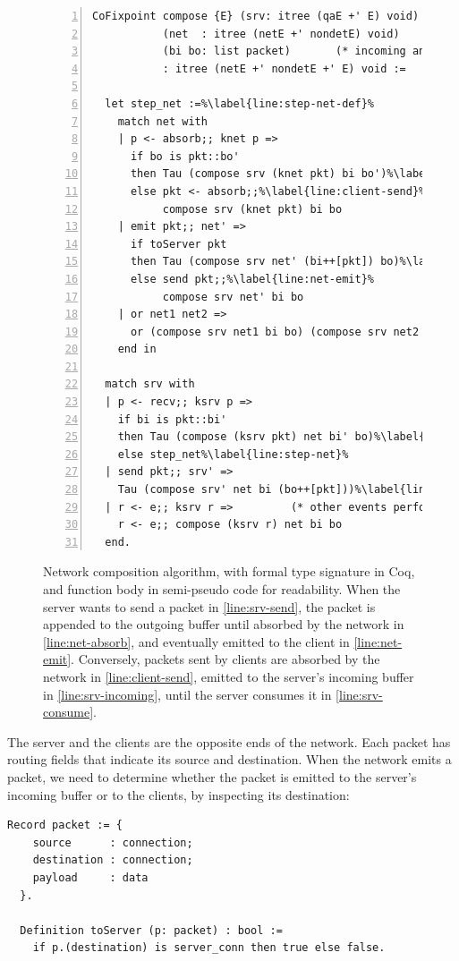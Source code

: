 \begin{figure}
\begin{lstlisting}[style=customcoq,numbers=left,escapechar=\%]
CoFixpoint compose {E} (srv: itree (qaE +' E) void)   (* server  model *)
           (net  : itree (netE +' nondetE) void)      (* network model *)
           (bi bo: list packet)       (* incoming and outgoing buffers *)
           : itree (netE +' nondetE +' E) void :=

  let step_net :=%\label{line:step-net-def}%
    match net with
    | p <- absorb;; knet p =>
      if bo is pkt::bo'
      then Tau (compose srv (knet pkt) bi bo')%\label{line:net-absorb}%
      else pkt <- absorb;;%\label{line:client-send}%
           compose srv (knet pkt) bi bo
    | emit pkt;; net' =>
      if toServer pkt
      then Tau (compose srv net' (bi++[pkt]) bo)%\label{line:srv-incoming}%
      else send pkt;;%\label{line:net-emit}%
           compose srv net' bi bo
    | or net1 net2 =>
      or (compose srv net1 bi bo) (compose srv net2 bi bo)
    end in

  match srv with
  | p <- recv;; ksrv p =>
    if bi is pkt::bi'
    then Tau (compose (ksrv pkt) net bi' bo)%\label{line:srv-consume}%
    else step_net%\label{line:step-net}%
  | send pkt;; srv' =>
    Tau (compose srv' net bi (bo++[pkt]))%\label{line:srv-send}%
  | r <- e;; ksrv r =>         (* other events performed by the server *)
    r <- e;; compose (ksrv r) net bi bo
  end.
\end{lstlisting}
\caption[Network composition algorithm]{Network composition algorithm, with
  formal type signature in Coq, and function body in semi-pseudo code for
  readability.  When the server wants to send a packet in
  \autoref{line:srv-send}, the packet is appended to the outgoing buffer until
  absorbed by the network in \autoref{line:net-absorb}, and eventually emitted
  to the client in \autoref{line:net-emit}.  Conversely, packets sent by clients
  are absorbed by the network in \autoref{line:client-send}, emitted to the
  server's incoming buffer in \autoref{line:srv-incoming}, until the server
  consumes it in \autoref{line:srv-consume}.}
\label{fig:net-compose-code}
\end{figure}

The server and the clients are the opposite ends of the network.  Each packet
has routing fields that indicate its source and destination.  When the network
emits a packet, we need to determine whether the packet is emitted to the
server's incoming buffer or to the clients, by inspecting its destination:
\begin{lstlisting}[style=customcoq]
  Record packet := {
    source      : connection;
    destination : connection;
    payload     : data
  }.

  Definition toServer (p: packet) : bool :=
    if p.(destination) is server_conn then true else false.
\end{lstlisting}

